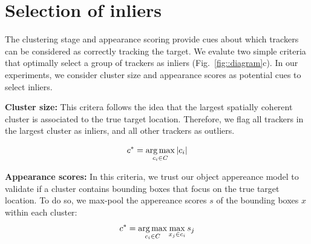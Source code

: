 \section{Selection of inliers}
\label{sec:inliers}
The clustering stage and appearance scoring provide cues about which trackers
can be considered as correctly tracking the target.
We evalute two simple criteria that optimally select a group of trackers as
inliers (Fig.~\ref{fig::diagram}c).
In our experiments, we consider cluster size and appearance scores as
potential cues to select inliers.


\textbf{Cluster size:}
This critera follows the idea that the largest spatially coherent cluster
is associated to the true target location. Therefore, we flag all trackers
in the largest cluster as \gls{inliers}, and all other trackers as \gls{outliers}.

\begin{equation}
 c^{*} = \operatorname*{arg\,max}_{c_i\in C} |c_i|
\end{equation}


\textbf{Appearance scores:}
In this criteria, we trust our object appereance model to validate if a cluster
contains bounding boxes that focus on the true target location.
To do so, we max-pool the appereance scores $s$ of the bounding boxes $x$ within
each cluster:
\begin{equation}
 c^{*} = \operatorname*{arg\,max}_{c_i\in C} \max_{x_j \in c_i} s_{j}
\end{equation}


